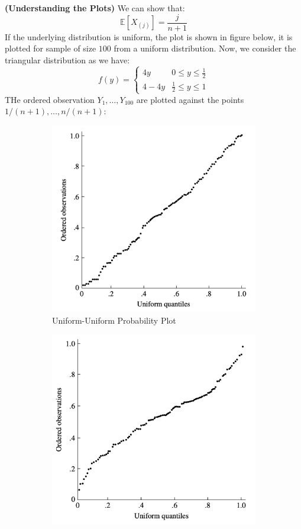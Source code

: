 \begin{remark}{\textbf{(Understanding the Plots)}}
    We can show that:
    \begin{equation*}
        \mathbb{E}[X_{(j)}] = \frac{j}{n+1}
    \end{equation*}
    If the underlying distribution is uniform, the plot is shown in figure below, it is plotted for sample of size $100$ from a uniform distribution. Now, we consider the triangular distribution as we have:
    \begin{equation*}
        f(y) = \begin{cases}
            4y & 0 \le y \le \frac{1}{2} \\
            4-4y & \frac{1}{2} \le y \le 1 
        \end{cases}
    \end{equation*}
    THe ordered observation $Y_{1},\dots,Y_{100}$ are plotted against the points $1/(n+1),\dots,n/(n+1)$:
    \begin{figure}[H]
    \centering
    \begin{subfigure}{.5\textwidth}
        \centering
        \includegraphics[width=0.7\linewidth]{img/img1.png}
        \caption{Uniform-Uniform Probability Plot}
        \label{fig:1-sub1}
    \end{subfigure}%
    \begin{subfigure}{.5\textwidth}
        \centering
        \includegraphics[width=0.7\linewidth]{img/img2.png}

\end{subfigure}
\end{figure}
\end{remark}
